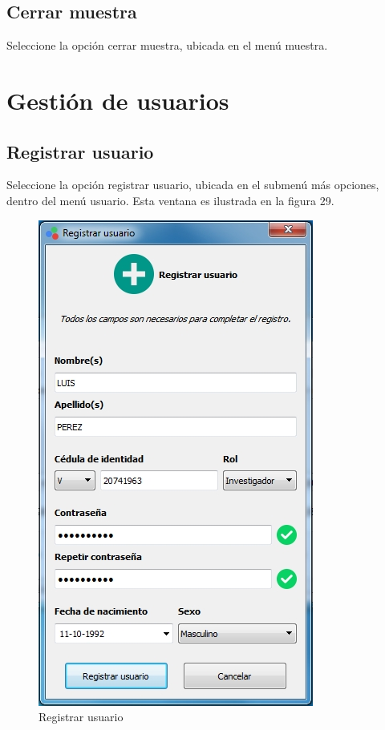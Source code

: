 \begin{figure}[H]
\begin{minipage}{.5\textwidth}
  \label{fig:test2}
\end{minipage}
\end{figure}

	\subsection{Cerrar muestra}
	
	Seleccione la opci\'{o}n cerrar muestra, ubicada en el men\'{u} muestra.

\newpage

\section{Gesti\'{o}n de usuarios}

	\subsection{Registrar usuario}
	
	Seleccione la opci\'{o}n registrar usuario, ubicada en el submen\'{u} m\'{a}s opciones, dentro del men\'{u} usuario. Esta ventana es ilustrada en la figura 29.
	
\begin{figure}[H]
  \centering
  \includegraphics[width=.6\linewidth]{./img/registrar-usuario.jpg}
\caption{Registrar usuario}
\end{figure}
	
